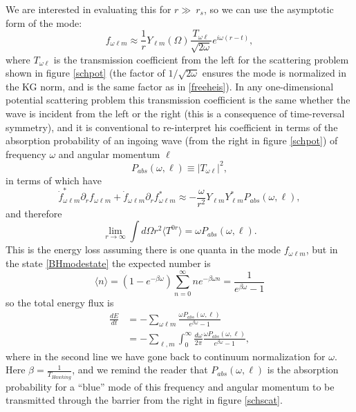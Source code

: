 \documentclass[12pt]{article}
\newcommand{\be}{\begin{equation}}
\newcommand{\ee}{\end{equation}}
\newcommand{\lan}{\langle}
\newcommand{\ran}{\rangle}
\begin{document}
We are interested in evaluating this for $r\gg\ r_s$, so we can use the asymptotic form of the mode:
\be
f_{\omega\ell m}\approx \frac{1}{r}Y_{\ell m}(\Omega)\frac{T_{\omega\ell}}{\sqrt{2\omega}}e^{i\omega (r-t)},
\ee
where $T_{\omega\ell}$ is the transmission coefficient from the left for the scattering problem shown in figure \ref{schpot} (the factor of $1/\sqrt{2\omega}$ ensures the mode is normalized in the KG norm, and is the same factor as in \eqref{freeheis}).  In any one-dimensional potential scattering problem this transmission coefficient is the same whether the wave is incident from the left or the right (this is a consequence of time-reversal symmetry), and it is conventional to re-interpret his coefficient in terms of the absorption probability of an ingoing wave (from the right in figure \ref{schpot}) of frequency $\omega$ and angular momentum $\ell$
\be
P_{\mathit{abs}}(\omega,\ell)\equiv |T_{\omega\ell}|^2,
\ee
in terms of which have
\be
\dot{f}_{\omega\ell m}^*\partial_r f_{\omega\ell m}+\dot{f}_{\omega\ell m}\partial_r f^*_{\omega\ell m}\approx -\frac{\omega}{r^2}Y_{\ell m}Y_{\ell m}^*P_{\mathit{abs}}(\omega,\ell),
\ee
and therefore
\be
\lim_{r\to\infty}\int d\Omega r^2 \lan T^{0r}\ran=\omega P_{\mathit{abs}}(\omega,\ell).
\ee
This is the energy loss assuming there is one quanta in the mode $f_{\omega\ell m}$, but in the state \eqref{BHmodestate} the expected number is
\be
\lan n\ran=(1-e^{-\beta \omega})\sum_{n=0}^\infty n e^{-\beta \omega n}=\frac{1}{e^{\beta \omega}-1}
\ee
so the total energy flux is
\begin{align}\nonumber
\frac{dE}{dt}&=-\sum_{\omega\ell m}\frac{\omega P_{\mathit{abs}}(\omega,\ell)}{e^{\beta \omega}-1}\\
&=-\sum_{\ell, m}\int_0^\infty \frac{d\omega}{2\pi}\frac{\omega P_{\mathit{abs}}(\omega,\ell)}{e^{\beta \omega}-1},\label{hawkresult}
\end{align}
where in the second line we have gone back to continuum normalization for $\omega$.  Here $\beta=\frac{1}{T_{\mathit{Hawking}}}$, and we remind the reader that $P_{\mathit{abs}}(\omega,\ell)$ is the absorption probability for a ``blue'' mode of this frequency and angular momentum to be transmitted through the barrier from the right in figure \ref{schscat}.
%
\end{document}
